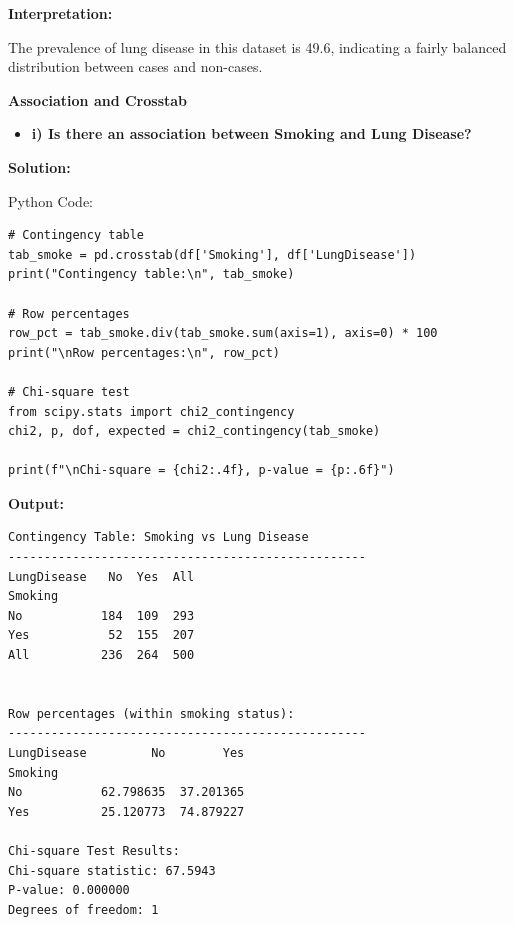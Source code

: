 \documentclass[12pt]{article}
\begin{document}
\vspace{0.4cm}

\textbf{Interpretation:}

The prevalence of lung disease in this dataset is 49.6, indicating a fairly balanced distribution between cases and non-cases.


\vspace{1cm}

{\large \textbf{Association and Crosstab}}

\vspace{0.3cm}

\begin{itemize}
    \item\textbf{i) Is there an association between Smoking and Lung Disease?}
\end{itemize}

{\large\textbf{Solution:}}

\vspace{0.1cm}

{\large{Python Code:}}

\vspace{0.2cm}

\begin{verbatim}
# Contingency table
tab_smoke = pd.crosstab(df['Smoking'], df['LungDisease'])
print("Contingency table:\n", tab_smoke)

# Row percentages
row_pct = tab_smoke.div(tab_smoke.sum(axis=1), axis=0) * 100
print("\nRow percentages:\n", row_pct)

# Chi-square test
from scipy.stats import chi2_contingency
chi2, p, dof, expected = chi2_contingency(tab_smoke)

print(f"\nChi-square = {chi2:.4f}, p-value = {p:.6f}")
\end{verbatim}

\textbf{Output:}

\vspace{0.3cm}

\begin{verbatim}
Contingency Table: Smoking vs Lung Disease
--------------------------------------------------
LungDisease   No  Yes  All
Smoking                   
No           184  109  293
Yes           52  155  207
All          236  264  500


Row percentages (within smoking status):
--------------------------------------------------
LungDisease         No        Yes
Smoking                          
No           62.798635  37.201365
Yes          25.120773  74.879227

Chi-square Test Results:
Chi-square statistic: 67.5943
P-value: 0.000000
Degrees of freedom: 1

\end{verbatim}
\end{document}
